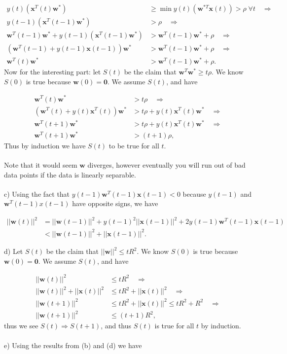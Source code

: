 \documentclass[11pt,letterpaper]{article}
\newcommand{\vv}[1]{\mathbf{#1}} %
\begin{document}
\begin{align*}
     y(t)(\vv{x}^T(t)\vv{w}^*) &\ge \min y(t)(\vv{w}^{*T}\vv{x}(t)) > \rho \; \forall t \quad \Longrightarrow \\
     y(t - 1)(\vv{x}^T(t - 1)\vv{w}^*) &> \rho \quad \Longrightarrow \\
     \vv{w}^T(t - 1)\vv{w}^*  + y(t - 1)(\vv{x}^T(t - 1)\vv{w}^*) &> \vv{w}^T(t - 1)\vv{w}^* + \rho \quad \Longrightarrow \\
     (\vv{w}^T(t - 1) + y(t - 1)\vv{x}(t - 1))\vv{w}^* &> \vv{w}^T(t - 1)\vv{w}^* + \rho \quad \Longrightarrow \\
     \vv{w}^T(t)\vv{w}^* &> \vv{w}^T(t - 1)\vv{w}^* + \rho.
\end{align*}
Now for the interesting part: let $S(t)$ be the claim that $\vv{w}^T\vv{w}^* \ge t\rho$.  We know $S(0)$ is true because $\vv{w}(0) = \vv{0}$.  We assume $S(t)$, and have

\begin{align*}
 \vv{w}^T(t)\vv{w}^* &> t\rho \quad \Longrightarrow \\
 (\vv{w}^T(t) + y(t)\vv{x}^T(t))\vv{w}^* &> t\rho +  y(t)\vv{x}^T(t)\vv{w}^* \quad \Longrightarrow \\
 \vv{w}^T(t + 1)\vv{w}^* &> t\rho +  y(t)\vv{x}^T(t)\vv{w}^* \quad \Longrightarrow \\
 \vv{w}^T(t + 1)\vv{w}^* &> (t + 1)\rho,
\end{align*}
Thus by induction we have $S(t)$ to be true for all $t$.
\\\\
Note that it would seem $\vv{w}$ diverges, however eventually you will run out of bad data points if the data is linearly separable.
\\\\
c) Using the fact that $y(t-1)\vv{w}^T(t - 1)\vv{x}(t-1) < 0$ because $y(t-1)$ and $\vv{w}^T(t-1){x}(t-1)$ have opposite signs, we have

\begin{align*}
    ||\vv{w}(t)||^2 &= ||\vv{w}(t - 1)||^2 + y(t-1)^2||\vv{x}(t - 1)||^2 + 2 y(t-1)\vv{w}^T(t - 1)\vv{x}(t-1) \\
    &< ||\vv{w}(t - 1)||^2 + ||\vv{x}(t-1)||^2.
\end{align*}

d) Let $S(t)$ be the claim that $||\vv{w}||^2 \le tR^2$.  We know $S(0)$ is true because $\vv{w}(0) = \vv{0}$.  We assume $S(t)$, and have

\begin{align*}
    ||\vv{w}(t)||^2 &\le tR^2 \quad \Longrightarrow \\
    ||\vv{w}(t)||^2 + ||\vv{x}(t)||^2 &\le tR^2 + ||\vv{x}(t)||^2 \quad \Longrightarrow \\
    ||\vv{w}(t + 1)||^2 &\le tR^2 + ||\vv{x}(t)||^2 \le tR^2 + R^2 \quad \Longrightarrow \\
    ||\vv{w}(t + 1)||^2 &\le (t + 1)R^2,
\end{align*}
thus we see $S(t) \Rightarrow S(t + 1)$, and thus $S(t)$ is true for all $t$ by induction.
\\\\
e) Using the results from (b) and (d) we have
\end{document}
